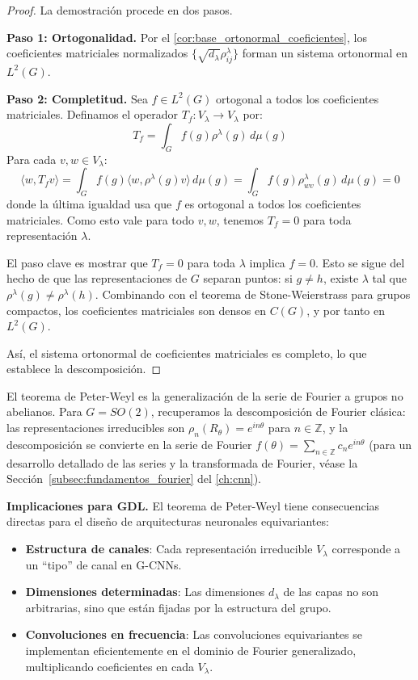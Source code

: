 \begin{proof}
La demostración procede en dos pasos.

\textbf{Paso 1: Ortogonalidad.} Por el \autoref{cor:base_ortonormal_coeficientes}, los coeficientes matriciales normalizados $\{\sqrt{d_\lambda} \rho^\lambda_{ij}\}$ forman un sistema ortonormal en $L^2(G)$.

\textbf{Paso 2: Completitud.} Sea $f \in L^2(G)$ ortogonal a todos los coeficientes matriciales. Definamos el operador $T_f: V_\lambda \to V_\lambda$ por:
\[
T_f = \int_G f(g) \rho^\lambda(g) \, d\mu(g)
\]
Para cada $v, w \in V_\lambda$:
\[
\langle w, T_f v \rangle = \int_G f(g) \langle w, \rho^\lambda(g) v \rangle \, d\mu(g) = \int_G f(g) \rho^\lambda_{wv}(g) \, d\mu(g) = 0
\]
donde la última igualdad usa que $f$ es ortogonal a todos los coeficientes matriciales. Como esto vale para todo $v, w$, tenemos $T_f = 0$ para toda representación $\lambda$.

El paso clave es mostrar que $T_f = 0$ para toda $\lambda$ implica $f = 0$. Esto se sigue del hecho de que las representaciones de $G$ separan puntos: si $g \neq h$, existe $\lambda$ tal que $\rho^\lambda(g) \neq \rho^\lambda(h)$. Combinando con el teorema de Stone-Weierstrass para grupos compactos, los coeficientes matriciales son densos en $C(G)$, y por tanto en $L^2(G)$.

Así, el sistema ortonormal de coeficientes matriciales es completo, lo que establece la descomposición.
\end{proof}

El teorema de Peter-Weyl es la generalización de la serie de Fourier a grupos no abelianos. Para $G = SO(2)$, recuperamos la descomposición de Fourier clásica: las representaciones irreducibles son $\rho_n(R_\theta) = e^{in\theta}$ para $n \in \mathbb{Z}$, y la descomposición se convierte en la serie de Fourier $f(\theta) = \sum_{n \in \mathbb{Z}} c_n e^{in\theta}$ (para un desarrollo detallado de las series y la transformada de Fourier, véase la Sección~\ref{subsec:fundamentos_fourier} del \autoref{ch:cnn}).

\textbf{Implicaciones para GDL.} El teorema de Peter-Weyl tiene consecuencias directas para el diseño de arquitecturas neuronales equivariantes:
\begin{itemize}
    \item \textbf{Estructura de canales}: Cada representación irreducible $V_\lambda$ corresponde a un ``tipo'' de canal en G-CNNs.
    \item \textbf{Dimensiones determinadas}: Las dimensiones $d_\lambda$ de las capas no son arbitrarias, sino que están fijadas por la estructura del grupo.
    \item \textbf{Convoluciones en frecuencia}: Las convoluciones equivariantes se implementan eficientemente en el dominio de Fourier generalizado, multiplicando coeficientes en cada $V_\lambda$.
\end{itemize}


